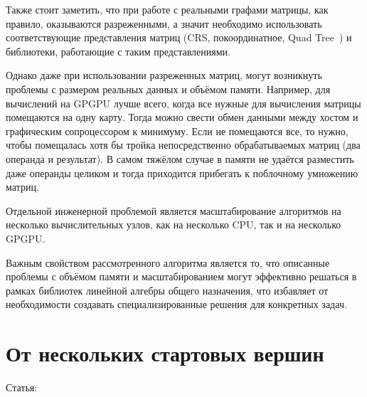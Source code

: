 Также стоит заметить, что при работе с реальными графами матрицы, как правило, оказываются разреженными, а значит необходимо использовать соответствующие представления матриц (CRS, покоординатное, Quad Tree~\cite{quadtree}) и библиотеки, работающие с таким представлениями.

Однако даже при использовании разреженных матриц, могут возникнуть проблемы с размером реальных данных и объёмом памяти.
Например, для вычислений на GPGPU лучше всего, когда все нужные для вычисления матрицы помещаются на одну карту.
Тогда можно свести обмен данными между хостом и графическим сопроцессором к минимуму.
Если не помещаются все, то нужно, чтобы помещалась хотя бы тройка непосредственно обрабатываемых матриц (два операнда и результат).
В самом тяжёлом случае в памяти не удаётся разместить даже операнды целиком и тогда приходится прибегать к поблочному умножению матриц.

Отдельной инженерной проблемой является масштабирование алгоритмов на несколько вычислительных узлов, как на несколько CPU, так и на несколько GPGPU.

Важным свойством рассмотренного алгоритма является то, что описанные проблемы с объёмом памяти и масштабированием могут эффективно решаться в рамках библиотек линейной алгебры общего назначения, что избавляет от необходимости создавать специализированные решения для конкретных задач.


\section{От нескольких стартовых вершин}

Статья:~\cite{Terekhov2021MultipleSourceCP}

